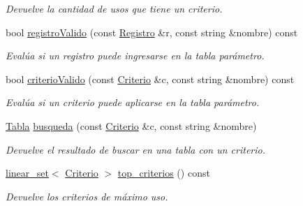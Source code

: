 \begin{DoxyCompactItemize}
\begin{DoxyCompactList}\small\item\em Devuelve la cantidad de usos que tiene un criterio. \end{DoxyCompactList}\item 
bool \hyperlink{classBaseDeDatos_a451ef7b34a2ff9d395da10745266b703}{registro\-Valido} (const \hyperlink{classRegistro}{Registro} \&r, const string \&nombre) const 
\begin{DoxyCompactList}\small\item\em Evalúa si un registro puede ingresarse en la tabla parámetro. \end{DoxyCompactList}\item 
bool \hyperlink{classBaseDeDatos_a43f25f2c23796d5133c75f1973898b36}{criterio\-Valido} (const \hyperlink{classBaseDeDatos_a6742a222e87623bc92a810a693fb337b}{Criterio} \&c, const string \&nombre) const 
\begin{DoxyCompactList}\small\item\em Evalúa si un criterio puede aplicarse en la tabla parámetro. \end{DoxyCompactList}\item 
\hyperlink{classTabla}{Tabla} \hyperlink{classBaseDeDatos_aa0676f34e537e650095e55b3eef852cb}{busqueda} (const \hyperlink{classBaseDeDatos_a6742a222e87623bc92a810a693fb337b}{Criterio} \&c, const string \&nombre)
\begin{DoxyCompactList}\small\item\em Devuelve el resultado de buscar en una tabla con un criterio. \end{DoxyCompactList}\item 
\hyperlink{classlinear__set}{linear\-\_\-set}$<$ \hyperlink{classBaseDeDatos_a6742a222e87623bc92a810a693fb337b}{Criterio} $>$ \hyperlink{classBaseDeDatos_a907976b069e65a933e025035d887a3b5}{top\-\_\-criterios} () const 
\begin{DoxyCompactList}\small\item\em Devuelve los criterios de máximo uso. \end{DoxyCompactList}\end{DoxyCompactItemize}
